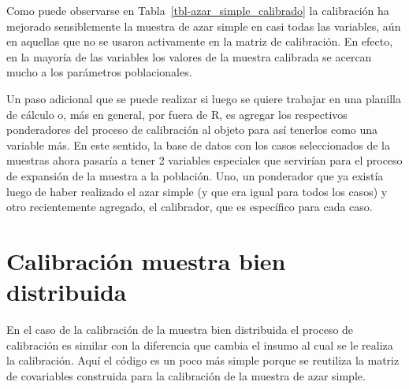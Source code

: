 \documentclass[
  spanish,
  a4paper,
]{scrreprt}
\begin{document}
Como puede observarse en Tabla~\ref{tbl-azar_simple_calibrado} la
calibración ha mejorado sensiblemente la muestra de azar simple en casi
todas las variables, aún en aquellas que no se usaron activamente en la
matriz de calibración. En efecto, en la mayoría de las variables los
valores de la muestra calibrada se acercan mucho a los parámetros
poblacionales.

Un paso adicional que se puede realizar si luego se quiere trabajar en
una planilla de cálculo o, más en general, por fuera de R, es agregar
los respectivos ponderadores del proceso de calibración al objeto para
así tenerlos como una variable más. En este sentido, la base de datos
con los casos seleccionados de la muestras ahora pasaría a tener 2
variables especiales que servirían para el proceso de expansión de la
muestra a la población. Uno, un ponderador que ya existía luego de haber
realizado el azar simple (y que era igual para todos los casos) y otro
recientemente agregado, el calibrador, que es específico para cada caso.

\begin{table}

\caption{\label{tbl-base_muestra_AS_cal}Ponderadores y calibradores.
Base muestra azar simple.}


\end{table}%

\section{Calibración muestra bien
distribuida}\label{sec-cal_bien_distribuida}

En el caso de la calibración de la muestra bien distribuida el proceso
de calibración es similar con la diferencia que cambia el insumo al cual
se le realiza la calibración. Aquí el código es un poco más simple
porque se reutiliza la matriz de covariables construida para la
calibración de la muestra de azar simple.
\end{document}
